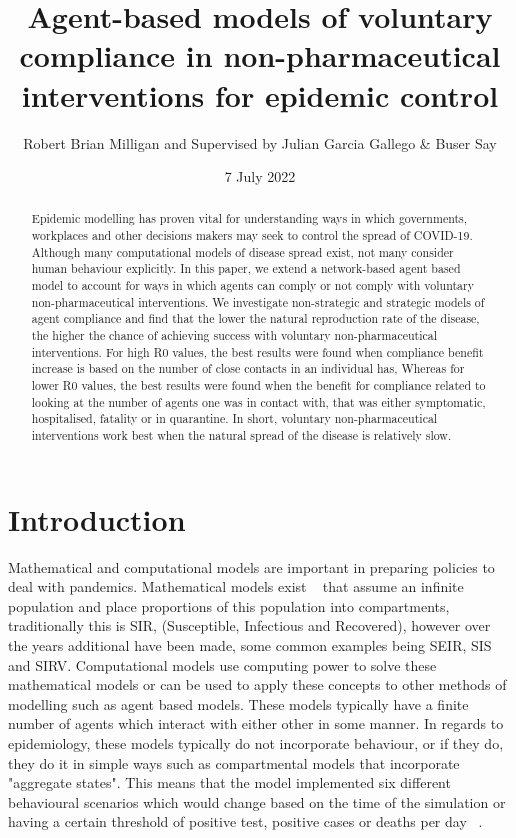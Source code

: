 \documentclass{article}
\title{Agent-based models of voluntary compliance in non-pharmaceutical interventions for epidemic control}
\author{Robert Brian Milligan and Supervised by Julian Garcia Gallego \& Buser Say}
\date{7 July 2022}
\begin{document}
\maketitle

\begin{abstract}
Epidemic modelling has proven vital for understanding ways in which governments, workplaces and other decisions makers may seek to control the spread of COVID-19. Although many computational models of disease spread exist, not many consider human behaviour explicitly. In this paper, we extend a network-based agent based model to account for ways in which agents can comply or not comply with voluntary non-pharmaceutical interventions. We investigate non-strategic and strategic models of agent compliance and find that the lower the natural reproduction rate of the disease, the higher the chance of achieving success with voluntary non-pharmaceutical interventions. For high R0 values, the best results were found when compliance benefit increase is based on the number of close contacts in an individual has, Whereas for lower R0 values, the best results were found when the benefit for compliance related to looking at the number of agents one was in contact with, that was either symptomatic, hospitalised, fatality or in quarantine. In short, voluntary non-pharmaceutical interventions work best when the natural spread of the disease is relatively slow.
\end{abstract}



\tableofcontents

\newpage 

\section{Introduction}

Mathematical and computational models are important in preparing policies to deal with pandemics. Mathematical models exist ~\cite{cooper_mondal_antonopoulos_2020} that assume an infinite population and place proportions of this population into compartments, traditionally this is SIR, (Susceptible, Infectious and Recovered), however over the years additional have been made, some common examples being SEIR, SIS and SIRV. Computational models use computing power to solve these mathematical models or can be used to apply these concepts to other methods of modelling such as agent based models. These models typically have a finite number of agents which interact with either other in some manner. In regards to epidemiology, these models typically do not incorporate behaviour, or if they do, they do it in simple ways such as compartmental models that incorporate "aggregate states". This means that the model implemented six different behavioural scenarios which would change based on the time of the simulation or having a certain threshold of positive test, positive cases or deaths per day ~\cite{karaivanov_2020}.\linebreak
\end{document}
